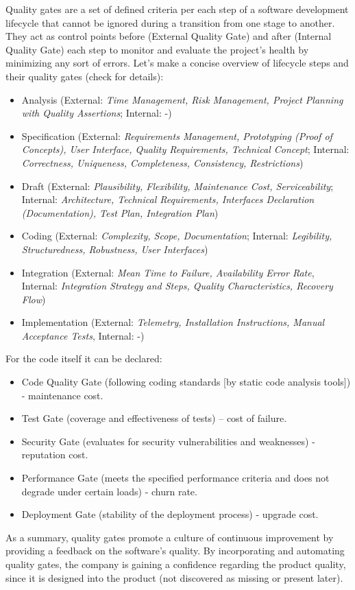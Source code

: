 Quality gates are a set of defined criteria per each step of a software development lifecycle that cannot be
ignored during a transition from one stage to another. They act as control points before (External Quality Gate) and 
after (Internal Quality Gate) each step to monitor and evaluate the project's health by minimizing any sort of errors.
Let's make a concise overview of lifecycle steps and their quality gates (check \cite{Hawl02} for details):

\begin{itemize}
  \item Analysis (External: \emph{Time Management, Risk Management, Project Planning with Quality Assertions}; 
  Internal: -)

  \item Specification (External: \emph{Requirements Management, Prototyping (Proof of Concepts), User Interface, 
  Quality Requirements, Technical Concept}; Internal: \emph{Correctness, Uniqueness, Completeness, Consistency, 
  Restrictions})

  \item Draft (External: \emph{Plausibility, Flexibility, Maintenance Cost, Serviceability}; Internal: 
  \emph{Architecture, Technical Requirements, Interfaces Declaration (Documentation), Test Plan, Integration Plan}) 

  \item Coding (External: \emph{Complexity, Scope, Documentation}; Internal: \emph{Legibility, Structuredness, 
  Robustness, User Interfaces})

  \item Integration (External: \emph{Mean Time to Failure, Availability Error Rate}, Internal: \emph{Integration 
  Strategy and Steps, Quality Characteristics, Recovery Flow})

  \item Implementation (External: \emph{Telemetry, Installation Instructions, Manual Acceptance Tests}, Internal: -)
\end{itemize}

\noindent For the code itself it can be declared: 

\begin{itemize}
  \item Code Quality Gate (following coding standards [by static code analysis tools]) - maintenance cost.
  \item Test Gate (coverage and effectiveness of tests) -- cost of failure.
  \item Security Gate (evaluates for security vulnerabilities and weaknesses) - reputation cost.
  \item Performance Gate (meets the specified performance criteria and does not degrade under certain loads) - churn rate.
  \item Deployment Gate (stability of the deployment process) - upgrade cost.
\end{itemize}

As a summary, quality gates promote a culture of continuous improvement by providing a feedback on the software's 
quality. By incorporating and automating quality gates, the company is gaining a confidence regarding the
product quality, since it is designed into the product (not discovered as missing or present later).
